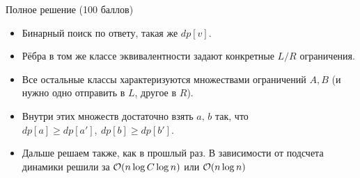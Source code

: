\begin{frame}{Полное решение (100 баллов)}
  \begin{itemize}
  \item Бинарный поиск по ответу, такая же $dp[v]$.
  \item Рёбра в том же классе эквивалентности задают конкретные $L/R$ ограничения.
  \item Все остальные классы характеризуются множествами ограничений $A, B$ (и нужно одно отправить в $L$, другое в $R$).
  \item Внутри этих множеств достаточно взять $a,\,b$ так, что $dp[a] \ge dp[a'],\ dp[b] \ge dp[b']$.
  \item Дальше решаем также, как в прошлый раз. В зависимости от подсчета динамики решили за $\mathcal{O}(n \log C \log n)$ или $\mathcal{O}(n \log n)$
  \end{itemize}
\end{frame}
